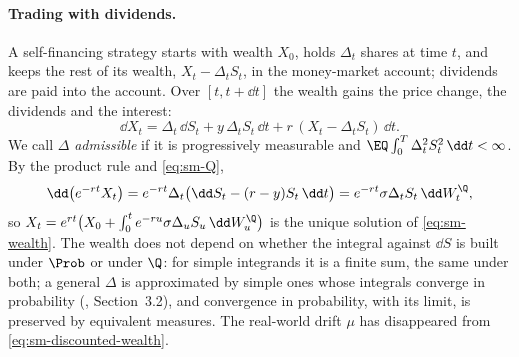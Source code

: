 \paragraph{Trading with dividends.} A self-financing strategy starts with wealth $X_0$, holds
$\Delta_t$ shares at time $t$, and keeps the rest of its wealth, $X_t-\Delta_tS_t$, in the
money-market account; dividends are paid into the account. Over $[t,t+\dd t]$ the wealth gains
the price change, the dividends and the interest:
\begin{equation}\label{eq:sm-wealth}
  \dd X_t=\Delta_t\,\dd S_t+y\,\Delta_tS_t\,\dd t+r\,(X_t-\Delta_tS_t)\,\dd t .
\end{equation}
We call $\Delta$ \emph{admissible} if it is progressively measurable and
$\EQ\int_0^T\Delta_t^2S_t^2\,\dd t<\infty$. By the product rule and \eqref{eq:sm-Q},
\begin{equation}\label{eq:sm-discounted-wealth}
  \dd\big(e^{-rt}X_t\big)=e^{-rt}\Delta_t\big(\dd S_t-(r-y)S_t\,\dd t\big)=e^{-rt}\sigma\Delta_tS_t\,\dd W^\Q_t ,
\end{equation}
so $X_t=e^{rt}\big(X_0+\int_0^te^{-ru}\sigma\Delta_uS_u\,\dd W^\Q_u\big)$ is the unique solution of
\eqref{eq:sm-wealth}. The wealth does not depend on whether the integral against $\dd S$ is built
under $\Prob$ or under $\Q$: for simple integrands it is a finite sum, the same under both; a
general $\Delta$ is approximated by simple ones whose integrals converge in probability
(\textcite{karatzas-shreve}, Section~3.2), and convergence in probability, with its limit, is
preserved by equivalent measures.
The real-world drift $\mu$ has disappeared from \eqref{eq:sm-discounted-wealth}.

